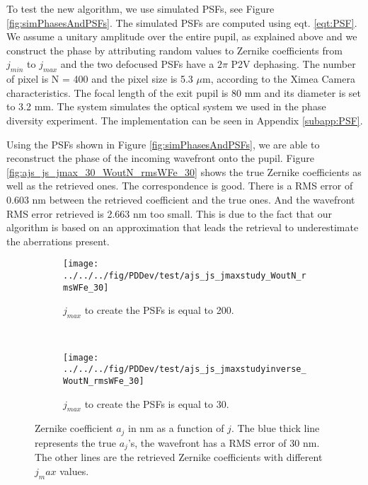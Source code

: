To test the new algorithm, we use simulated PSFs, see Figure \ref{fig:simPhasesAndPSFs}. The simulated PSFs are computed using eqt. \eqref{eqt:PSF}. We assume a unitary amplitude over the entire pupil, as explained above and we construct the phase by attributing random values to Zernike coefficients from $j_{min}$ to $j_{max}$ and the two defocused PSFs have a $2\pi$ P2V dephasing. The number of pixel is N = 400 and the pixel size is 5.3 $\mu$m, according to the Ximea Camera characteristics. The focal length of the exit pupil is 80 mm and its diameter is set to 3.2 mm. The system simulates the optical system we used in the phase diversity experiment. The implementation can be seen in Appendix \ref{subapp:PSF}. 

Using the PSFs shown in Figure \ref{fig:simPhasesAndPSFs}, we are able to reconstruct the phase of the incoming wavefront onto the pupil. Figure \ref{fig:ajs_js_jmax_30_WoutN_rmsWFe_30} shows the true Zernike coefficients as well as the retrieved ones. The correspondence is good. There is a RMS error of 0.603 nm between the retrieved coefficient and the true ones. And the wavefront RMS error retrieved is 2.663 nm too small. This is due to the fact that our algorithm is based on an approximation that leads the retrieval to underestimate the aberrations present.

\begin{figure}
\centering
    \begin{subfigure}{\textwidth}
        \texttt{[image: ../../../fig/PDDev/test/ajs\_js\_jmaxstudy\_WoutN\_rmsWFe\_30]}
        \caption{$j_{max}$ to create the PSFs is equal to 200.}
        \label{subfig:ajs_js_jmaxstudy_WoutN_rmsWFe_30}
    \end{subfigure}
    \\
    \begin{subfigure}{\textwidth}
        \texttt{[image: ../../../fig/PDDev/test/ajs\_js\_jmaxstudyinverse\_WoutN\_rmsWFe\_30]}
        \caption{$j_{max}$ to create the PSFs is equal to 30.}
        \label{subfig:ajs_js_jmaxstudyinverse_WoutN_rmsWFe_30}
    \end{subfigure}
    \decoRule
    \caption{Zernike coefficient $a_j$ in nm as a function of $j$. The blue thick line represents the true $a_j$'s, the wavefront has a RMS error of 30 nm. The other lines are the retrieved Zernike coefficients with different $j_max$ values.}
\end{figure}


